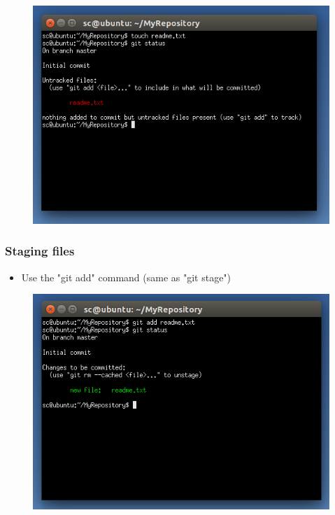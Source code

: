 \documentclass{beamer}
\begin{document}
\begin{frame}
\begin{figure}
\begin{center}
\includegraphics[scale=0.5]{gitstatus1}
\end{center}
\end{figure}
\end{frame}

\begin{frame}
\frametitle{Staging files}
\begin{itemize}
\item Use the "git add" command (same as "git stage")
\end{itemize}
\begin{figure}
\begin{center}
\includegraphics[scale=0.5]{gitadd0}
\end{center}
\end{figure}
\end{frame}
\end{document}
